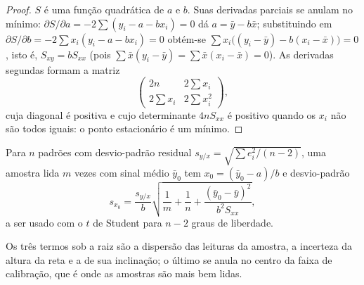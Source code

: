 \begin{proof}
$S$ é uma função quadrática de $a$ e $b$. Suas derivadas parciais se anulam no mínimo:
$\partial S/\partial a = -2\sum(y_i - a - bx_i) = 0$ dá $a = \bar y - b\bar x$; substituindo em
$\partial S/\partial b = -2\sum x_i(y_i - a - bx_i) = 0$ obtém-se $\sum x_i\bigl((y_i - \bar y) - b(x_i -
\bar x)\bigr) = 0$, isto é, $S_{xy} = bS_{xx}$ (pois $\sum \bar x(y_i - \bar y) = \sum \bar x(x_i - \bar
x) = 0$). As derivadas segundas formam a matriz
\[\begin{pmatrix} 2n & 2\sum x_i\\ 2\sum x_i & 2\sum x_i^2\end{pmatrix},\]
cuja diagonal é positiva e cujo determinante $4nS_{xx}$ é positivo quando os $x_i$ não são todos
iguais: o ponto estacionário é um mínimo.
\end{proof}

\begin{proposition}\label{prop:b2:measurement-statistics:interpolation}
Para $n$ padrões com desvio-padrão residual $s_{y/x} = \sqrt{\sum e_i^2/(n-2)}$, uma amostra lida
$m$ vezes com sinal médio $\bar y_0$ tem $x_0 = (\bar y_0 - a)/b$ e desvio-padrão
\begin{equation*}
s_{x_0} = \frac{s_{y/x}}{b}\sqrt{\frac1m + \frac1n + \frac{(\bar y_0 - \bar y)^2}{b^2S_{xx}}},
\end{equation*}
a ser usado com o $t$ de Student para $n - 2$ graus de liberdade.
\end{proposition}

\admitted

Os três termos sob a raiz são a dispersão das leituras da amostra, a incerteza da altura da reta e a
de sua inclinação; o último se anula no centro da faixa de calibração, que é onde as amostras são mais
bem lidas.

